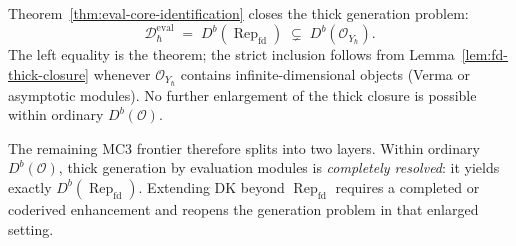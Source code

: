 \begin{remark}
\label{rem:corrected-mc3-frontier}
Theorem~\ref{thm:eval-core-identification} closes the thick
generation problem:
\begin{equation}\label{eq:eval-core-sandwich}
\mathcal{D}_\hbar^{\mathrm{eval}}
\;=\; D^b(\operatorname{Rep}_{\mathrm{fd}})
\;\subsetneq\; D^b(\mathcal{O}_{Y_\hbar}).
\end{equation}
The left equality is the theorem; the strict inclusion follows from
Lemma~\ref{lem:fd-thick-closure} whenever $\mathcal{O}_{Y_\hbar}$
contains infinite-dimensional objects (Verma or asymptotic modules).
No further enlargement of the thick closure is possible within
ordinary $D^b(\mathcal{O})$.

The remaining MC3 frontier therefore splits into two layers.
Within ordinary $D^b(\mathcal{O})$, thick generation by evaluation
modules is \emph{completely resolved}: it yields exactly
$D^b(\operatorname{Rep}_{\mathrm{fd}})$.  Extending DK beyond
$\operatorname{Rep}_{\mathrm{fd}}$ requires a completed or coderived
enhancement and reopens the generation problem in that enlarged
setting.


\end{remark}
